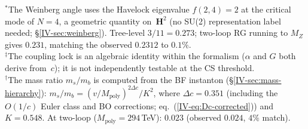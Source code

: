 \noindent
${}^*$The Weinberg angle uses the Havelock eigenvalue
$f(2,4) = 2$ at the critical mode of $N = 4$, a geometric
quantity on~$\mathbf{H}^2$ (no SU(2) representation label
needed; \S\ref*{IV-sec:weinberg}).
Tree-level $3/11 = 0.273$; two-loop RG running to $M_Z$
gives $0.231$, matching the observed $0.2312$ to $0.1\%$.\\[2pt]
${}^\ddagger$The coupling lock is an algebraic identity
within the formalism ($\alpha$ and $G$ both derive from~$c$);
it is not independently testable at the CS threshold.\\[2pt]
${}^\dagger$The mass ratio $m_s/m_b$ is computed from the
BF instanton (\S\ref*{IV-sec:mass-hierarchy}):
$m_s/m_b = (v/M_{\mathrm{poly}})^{2\Delta c}/K^2$,
where $\Delta c = 0.351$ (including the $O(1/c)$ Euler
class and BO corrections;
eq.~(\ref*{IV-eq:Dc-corrected})) and $K = 0.548$.
At two-loop ($M_{\mathrm{poly}} = 294$\,TeV): $0.023$
(observed $0.024$, $4\%$ match).

